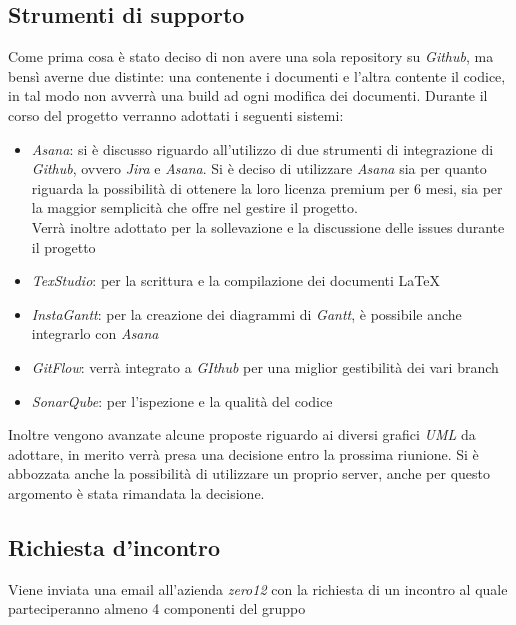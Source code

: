 \documentclass[a4paper,12pt]{article}
\begin{document}
	\subsection{Strumenti di supporto}
	Come prima cosa è stato deciso di non avere una sola repository su \textit{Github}, ma bensì averne due distinte: una contenente i documenti e l'altra contente il codice, in tal modo non avverrà una build ad ogni modifica dei documenti.
	Durante il corso del progetto verranno adottati i seguenti sistemi:
	\begin{itemize}
		\item\textit{Asana}: si è discusso riguardo all'utilizzo di due strumenti di integrazione di \textit{Github}, ovvero \textit{Jira} e \textit{Asana}. Si è deciso di utilizzare \textit{Asana} sia per quanto riguarda la possibilità di ottenere la loro licenza premium per 6 mesi, sia per la maggior semplicità che offre nel gestire il progetto. \\
		Verrà inoltre adottato per la sollevazione e la discussione delle issues durante il progetto
		\item \textit{TexStudio}: per la scrittura e la compilazione dei documenti \LaTeX 
		\item \textit{InstaGantt}: per la creazione dei diagrammi di \textit{Gantt}, è possibile anche integrarlo con \textit{Asana}
		\item \textit{GitFlow}: verrà integrato a \textit{GIthub} per una miglior gestibilità dei vari branch
		\item \textit{SonarQube}: per l'ispezione e la qualità del codice		
	\end{itemize}	
	Inoltre vengono avanzate alcune proposte riguardo ai diversi grafici \textit{UML} da adottare, in merito verrà presa una decisione entro la prossima riunione. Si è abbozzata anche la possibilità di utilizzare un proprio server, anche per questo argomento è stata rimandata la decisione.
	\subsection{Richiesta d'incontro}
	Viene inviata una email all'azienda \textit{zero12} con la richiesta di un incontro al quale parteciperanno almeno 4 componenti del gruppo
\end{document}
